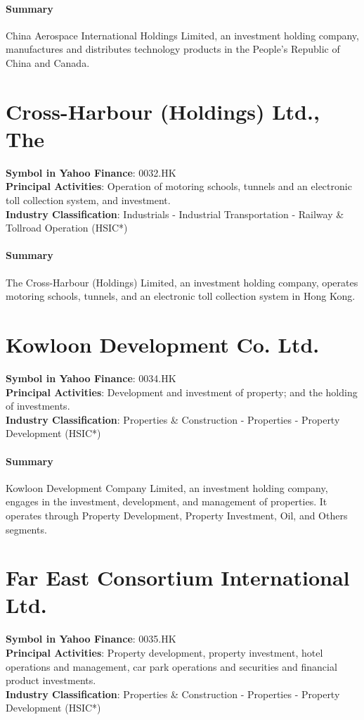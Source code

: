 \paragraph{Summary}
China Aerospace International Holdings Limited, an investment holding company, manufactures and distributes technology products in the People's Republic of China and Canada.


\section{Cross-Harbour (Holdings) Ltd., The}
\textbf{Symbol in Yahoo Finance}: 0032.HK\\
\textbf{Principal Activities}: Operation of motoring schools, tunnels and an electronic toll collection system, and investment.\\
\textbf{Industry Classification}: Industrials - Industrial Transportation - Railway \& Tollroad Operation (HSIC*)
\paragraph{Summary}
The Cross-Harbour (Holdings) Limited, an investment holding company, operates motoring schools, tunnels, and an electronic toll collection system in Hong Kong.


\section{Kowloon Development Co. Ltd.}
\textbf{Symbol in Yahoo Finance}: 0034.HK\\
\textbf{Principal Activities}: Development and investment of property; and the holding of investments.\\
\textbf{Industry Classification}: Properties \& Construction - Properties - Property Development (HSIC*)
\paragraph{Summary}
Kowloon Development Company Limited, an investment holding company, engages in the investment, development, and management of properties. It operates through Property Development, Property Investment, Oil, and Others segments.


\section{Far East Consortium International Ltd.}
\textbf{Symbol in Yahoo Finance}: 0035.HK\\
\textbf{Principal Activities}: Property development, property investment, hotel operations and management, car park operations and securities and financial product investments.\\
\textbf{Industry Classification}: Properties \& Construction - Properties - Property Development (HSIC*)

